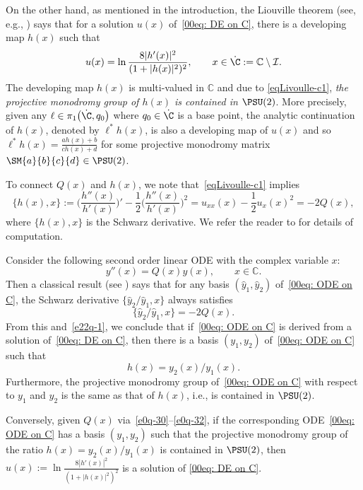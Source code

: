 On the other hand, as mentioned in the introduction, the Liouville
theorem (see, e.g., \cite{Chai-Lin-Wang}) says that for a solution
$u(x)$ of~\eqref{00eq: DE on C}, there is a developing map $h(x)$ such
that
\begin{equation}\label{eqLivoulle-c1}
u(x)=\ln\frac{8|h'(x)|^2}{(1+|h(x)|^2)^2},\qquad x\in \dot{\C}:=\mathbb{C}\setminus\mathcal{I}.
\end{equation}
The developing map $h(x)$ is multi-valued in $\mathbb{C}$ and due to
\eqref{eqLivoulle-c1}, \emph{the projective monodromy group of $h(x)$
 is contained in $\PSU(2)$}. More precisely, given any $\ell\in
\pi_1\bigl(\dot{\C}, q_0\bigr)$ where $q_0\in\dot{\C}$ is a base point, the
analytic continuation of $h(x)$, denoted by $\ell^*h(x)$, is also a
developing map of $u(x)$ and so $\ell^*h(x)=\frac{ah(x)+b}{ch(x)+d}$
for some projective monodromy matrix $\SM{a}{b}{c}{d}\in\PSU(2)$.

To connect $Q(x)$ and $h(x)$, we note that~\eqref{eqLivoulle-c1} implies
\begin{equation}\label{e22q-1}
\{h(x),x\}:=\biggl(\frac{h''(x)}{h'(x)}\biggr)'-\frac12 \biggl(\frac{h''(x)}{h'(x)}\biggr)^2=u_{xx}(x)-\frac12 u_x(x)^2=-2Q(x),
\end{equation}
where $\{h(x),x\}$ is the Schwarz derivative. We refer the reader to
\cite{Chai-Lin-Wang} for details of computation.

Consider the following second order linear ODE with the complex variable $x$:
\begin{equation}\label{00eq: ODE on C}
y''(x)=Q(x)y(x),\qquad x\in\mathbb{C}.
\end{equation}
Then a classical result (see \cite{Whittaker-Watson}) says that for
any basis $(\hat{y}_1,\hat{y}_2)$ of~\eqref{00eq: ODE on C}, the
Schwarz derivative $\{\hat{y}_2/\hat{y}_1,x\}$ always satisfies
\begin{equation*}
\{\hat{y}_2/\hat{y}_1,x\}=-2Q(x).
\end{equation*}
From this and~\eqref{e22q-1}, we conclude that if~\eqref{00eq: ODE on
 C} is derived from a solution of~\eqref{00eq: DE on C}, then there
is a basis $(y_1,y_2)$ of~\eqref{00eq: ODE on C} such that
\begin{equation}\label{e22q-2}
h(x)=y_2(x)/y_1(x).
\end{equation}
Furthermore, the projective monodromy group of~\eqref{00eq: ODE on C}
with respect to $y_1$ and $y_2$ is the same as that of $h(x)$, i.e., is
contained in $\PSU(2)$.

Conversely, given $Q(x)$ via~\eqref{e0q-30}--\eqref{e0q-32}, if the
corresponding ODE~\eqref{00eq: ODE on C} has a basis $(y_1,y_2)$ such
that the projective monodromy group of the ratio $h(x)=y_2(x)/y_1(x)$
is contained in $\PSU(2)$, then
$u(x):=\ln\frac{8|h'(x)|^2}{(1+|h(x)|^2)^2}$ is a solution of
\eqref{00eq: DE on C}.


